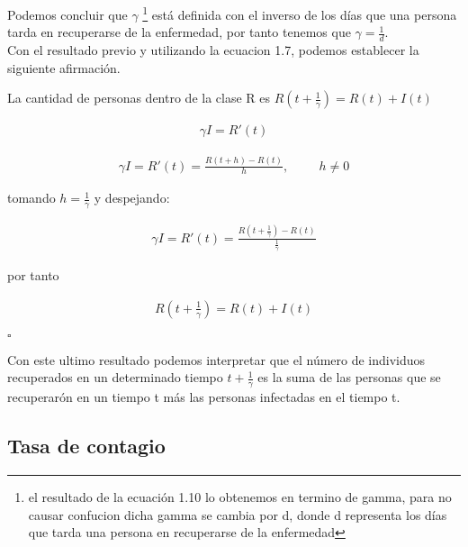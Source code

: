Podemos concluir que $\gamma$ \footnote{el resultado de la ecuación 1.10 lo obtenemos en termino de gamma, para no causar confucion dicha gamma se cambia por d, donde d representa los días que tarda una persona en recuperarse de la enfermedad} está definida con el inverso de los días que una persona tarda en recuperarse de la enfermedad, por tanto tenemos que $\gamma = \frac{1}{d}$.\\

Con el resultado previo y utilizando la ecuacion 1.7, podemos establecer la siguiente afirmación.

\begin{Af}
La cantidad de personas dentro de la clase R es $R(t+\frac{1}{\gamma}) = R(t) + I(t)$
\end{Af}

\begin{Dem}
\begin{align*}
\gamma I = R'(t)
\end{align*}

\begin{align*}
\gamma I = R'(t) = \frac{R\left( t + h \right) - R\left(t\right)}{h}, \hspace{1cm} h \neq 0
\end{align*}

tomando $h = \frac{1}{\gamma}$ y despejando: 

\begin{align*}
\gamma I = R'(t) = \frac{R\left( t + \frac{1}{\gamma} \right) - R\left(t\right)}{\frac{1}{\gamma}}
\end{align*}

por tanto

\begin{align*}
R\left( t + \frac{1}{\gamma} \right) = R(t) + I(t)
\end{align*}

\hfill	$\square$
\end{Dem}

Con este ultimo resultado podemos interpretar que el número de individuos recuperados en un determinado tiempo $t + \frac {1}{\gamma}$  es la suma de las personas que se recuperarón en un tiempo t más las personas infectadas en el tiempo t.

\newpage

\subsection{\textbf{Tasa de contagio}}

